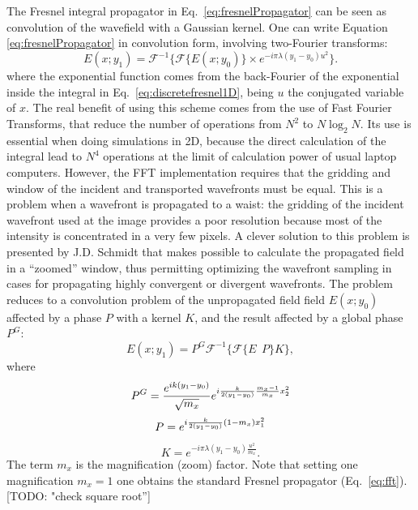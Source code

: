 \documentclass{iucr}              %
\newcommand{\todo}[1]{{\color{red}[TODO: "#1'']}}
\begin{document}
The Fresnel integral propagator in Eq.~\ref{eq:fresnelPropagator} can be seen as convolution of the wavefield with a Gaussian kernel.    
One can write Equation \ref{eq:fresnelPropagator} in convolution form, involving two-Fourier transforms:
\begin{equation}\label{eq:fft}
E(x; y_1) = \mathcal{F}^{-1}\Big\{ \mathcal{F}\{E(x; y_0)\} \times e^{-i \pi \lambda (y_1-y_0) u^2} \Big\}.
\end{equation} 
where the exponential function comes from the back-Fourier of the exponential inside the integral in Eq.~\ref{eq:discretefresnel1D}, being $u$ the conjugated variable of $x$. 
The real benefit of using this scheme comes from the use of Fast Fourier Transforms, that reduce the number of operations from $N^2$ to $N \log_2 N$. Its use is essential when doing simulations in 2D, because the direct calculation of the integral lead to $N^4$ operations at the limit of calculation power of usual laptop computers. However, the FFT implementation requires that the gridding and window of the incident and transported wavefronts must be equal. This is a problem when a wavefront is propagated to a waist: the gridding of the incident wavefront used at the image provides a poor resolution because most of the intensity is concentrated in a very few pixels. A clever solution to this problem is presented by J.D. Schmidt \cite{schmidt} that makes possible to calculate the propagated field in a ``zoomed'' window, thus permitting optimizing the wavefront sampling in cases for propagating highly convergent or divergent wavefronts. The problem reduces to a convolution problem of the unpropagated field field $E(x;y_0)$ affected by a phase $P$ with a kernel $K$, and the result affected by a global phase $P^G$: 
\begin{equation}
E(x; y_1) = P^G \mathcal{F}^{-1} \Big\{ \mathcal{F} \big\{ E~~P \big\} K \Big\},
\end{equation}
where
\begin{equation}
P^G =  \frac { e^{ik(y_1-y_0) }}{\sqrt{m_x} }e^{i \frac{k}{2 (y_1-y_0)} \frac{m_x - 1}{m_x}x_2^2}  \\
\end{equation}
\begin{equation}
P = e^{i \frac{k}{2(y_1-y_0)} (1-m_x)x_1^2 } \\
\end{equation}
\begin{equation}
K = e^{-i \pi \lambda (y_1-y_0) \frac{u^2}{m_x} }.
\end{equation}
The term $m_x$ is the magnification (zoom) factor. 
Note that setting one magnification $m_x=1$ one obtains the standard Fresnel propagator (Eq.~\ref{eq:fft}). \todo{check square root}
\end{document}
